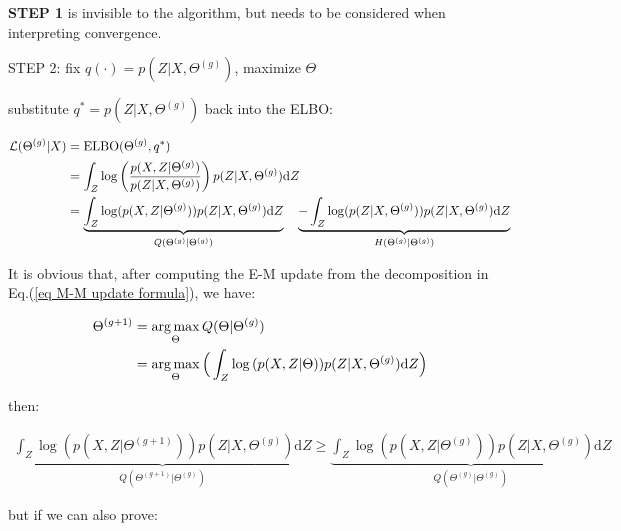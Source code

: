 \documentclass{article}
\def\L{{\cal L}}
\def\d{\text{d}}
\begin{document}
{\bf STEP 1} is invisible to the algorithm, but needs to be considered when interpreting convergence.


\begin{description}
      \item [STEP 2: fix  $q(\cdot) = p(Z|X, \Theta^{(g)})$, maximize $\Theta$]
\end{description}

substitute $q^* = p(Z|X, \Theta^{(g)} )$ back into the ELBO:


\begin{equation}\begin{split}\label{eq M-M update formula}
   \L(\Theta^{(g)}|X) &= \text{ELBO}(\Theta^{(g)}, q^*)\\
   &= \int_Z \log \left(\frac{p(X,Z|\Theta^{(g)})}{p(Z|X, \Theta^{(g)} )} \right) p(Z|X, \Theta^{(g)} ) \d Z\\
   &= \underbrace{\int_Z \log (p(X,Z|\Theta^{(g)})) p(Z|X, \Theta^{(g)} ) \d Z}_{Q (\Theta^{(g)} | \Theta^{(g)}) } \quad \underbrace{ - \int_Z \log (p(Z|X, \Theta^{(g)} )) p(Z|X, \Theta^{(g)} ) \d Z}_{H (\Theta^{(g)} | \Theta^{(g)}) }\\
\end{split}\end{equation}

It is obvious that, after computing the E-M update from the decomposition in Eq.(\ref{eq M-M update formula}), we have:

\begin{equation}\begin{split}\label{eq optimize Q}
\Theta^{(g+1)} &= \argmax_{\Theta} Q (\Theta | \Theta^{(g)})\\
&= \argmax_{\Theta} \Big( \int_Z \log{(p(X,Z|\Theta))} p(Z|X,\Theta^{(g)})  \d Z\Big)\\
\end{split}\end{equation}


then:

\begin{equation}\begin{split}
\underbrace{\int_Z \log (p(X,Z|\Theta^{(g+1)})) p(Z|X, \Theta^{(g)} ) \d Z}_{Q (\Theta^{(g+1)} | \Theta^{(g)}) } \ge \underbrace{\int_Z \log (p(X,Z|\Theta^{(g)})) p(Z|X, \Theta^{(g)} ) \d Z}_{Q (\Theta^{(g)} | \Theta^{(g)}) }
\end{split}\end{equation}

but if we can also prove:
\end{document}
